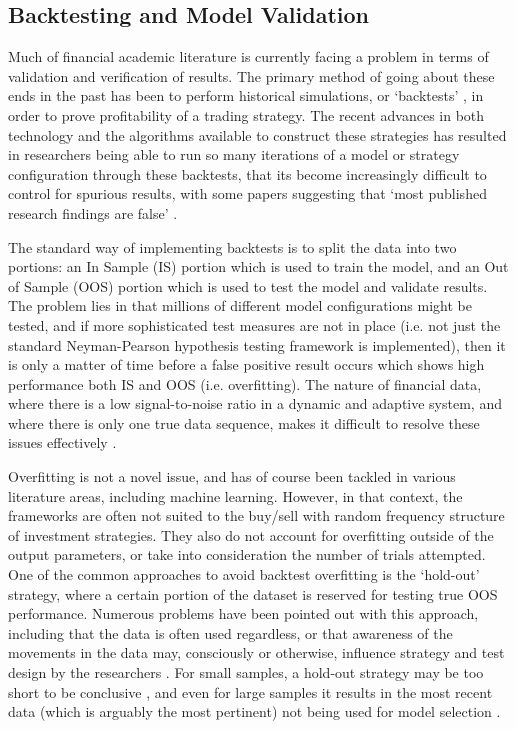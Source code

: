 \documentclass[a4paper,11pt,oneside]{article}
\theoremstyle{plain}
\theoremstyle{definition}
\begin{document}
	\subsection{Backtesting and Model Validation} \label{lr_backtesting}
	\hfill
	
	Much of financial academic literature is currently facing a problem in terms of validation and verification of results. 
	The primary method of going about these ends in the past has been to perform historical simulations, or ‘backtests’ ,
	in order to prove profitability of a trading strategy. The recent advances in both technology and the algorithms available 
	to construct these strategies has resulted in researchers being able to run so many iterations of a model or strategy
	configuration through these backtests, that its become increasingly difficult to control for spurious results, with some 
	papers suggesting that ‘most published research findings are false’   \cite{Ioannidis}.
	\hfill \break 
	
	The standard way of implementing backtests is to split the data into two portions: an In Sample (IS) portion which
	is used to train the model, and an Out of Sample (OOS) portion which is used to test the model and validate results. 
	The problem lies in that millions of different model configurations might be tested, and if more sophisticated test 
	measures are not in place (i.e. not just the standard Neyman-Pearson hypothesis testing framework is implemented), 
	then it is only a matter of time before a false positive result occurs which shows high performance both IS and OOS (i.e. overfitting). 
	The nature of financial data, where there is a low signal-to-noise ratio in a dynamic and adaptive system, and 
	where there is only one true data sequence, makes it difficult to resolve these issues effectively 
	\cite{BailyPBO, McLean}.
	\hfill \break 
	
	Overfitting is not a novel issue, and has of course been tackled in various literature areas, including machine learning. 
	However, in that context, the frameworks are often not suited to the buy/sell with random frequency structure of 
	investment strategies. They also do not account for overfitting outside of the output parameters, or take into 
	consideration the number of trials attempted. One of the common approaches to avoid backtest overfitting is the ‘hold-out’ strategy, where a certain portion of 
	the dataset is reserved for testing true OOS performance. Numerous problems have been pointed out with this 
	approach, including that the data is often used regardless, or that awareness of the movements in the data may, 
	consciously or otherwise, influence strategy and test design by the researchers \cite{Schorfheide}. For small samples, 
	a hold-out strategy may be too short to be conclusive \cite{Weiss}, and even for large samples it results in the 
	most recent data (which is arguably the most pertinent) not being used for model selection \cite{Hawkins, BailyPBO}.
	\hfill \break 
	
\end{document}
